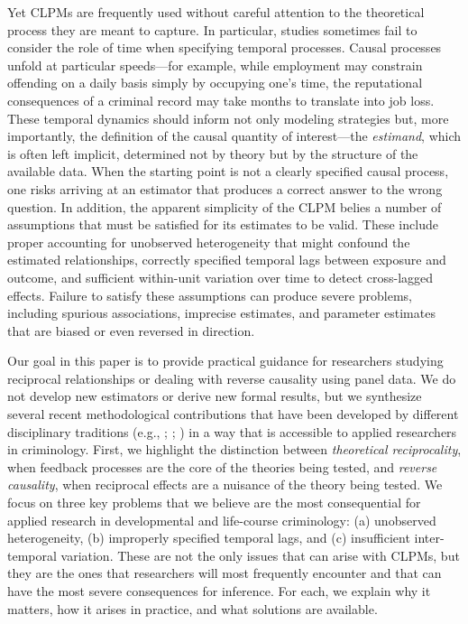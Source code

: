 \documentclass[
  letterpaper,
  DIV=11,
  numbers=noendperiod]{scrartcl}
\begin{document}
Yet CLPMs are frequently used without careful attention to the
theoretical process they are meant to capture. In particular, studies
sometimes fail to consider the role of time when specifying temporal
processes. Causal processes unfold at particular speeds---for example,
while employment may constrain offending on a daily basis simply by
occupying one's time, the reputational consequences of a criminal record
may take months to translate into job loss. These temporal dynamics
should inform not only modeling strategies but, more importantly, the
definition of the causal quantity of interest---the \emph{estimand},
which is often left implicit, determined not by theory but by the
structure of the available data. When the starting point is not a
clearly specified causal process, one risks arriving at an estimator
that produces a correct answer to the wrong question. In addition, the
apparent simplicity of the CLPM belies a number of assumptions that must
be satisfied for its estimates to be valid. These include proper
accounting for unobserved heterogeneity that might confound the
estimated relationships, correctly specified temporal lags between
exposure and outcome, and sufficient within-unit variation over time to
detect cross-lagged effects. Failure to satisfy these assumptions can
produce severe problems, including spurious associations, imprecise
estimates, and parameter estimates that are biased or even reversed in
direction.

Our goal in this paper is to provide practical guidance for researchers
studying reciprocal relationships or dealing with reverse causality
using panel data. We do not develop new estimators or derive new formal
results, but we synthesize several recent methodological contributions
that have been developed by different disciplinary traditions (e.g.,
; ; ) in a way that
is accessible to applied researchers in criminology. First, we highlight
the distinction between \emph{theoretical reciprocality}, when feedback
processes are the core of the theories being tested, and \emph{reverse
causality}, when reciprocal effects are a nuisance of the theory being
tested. We focus on three key problems that we believe are the most
consequential for applied research in developmental and life-course
criminology: (a) unobserved heterogeneity, (b) improperly specified
temporal lags, and (c) insufficient inter-temporal variation. These are
not the only issues that can arise with CLPMs, but they are the ones
that researchers will most frequently encounter and that can have the
most severe consequences for inference. For each, we explain why it
matters, how it arises in practice, and what solutions are available.
\end{document}
